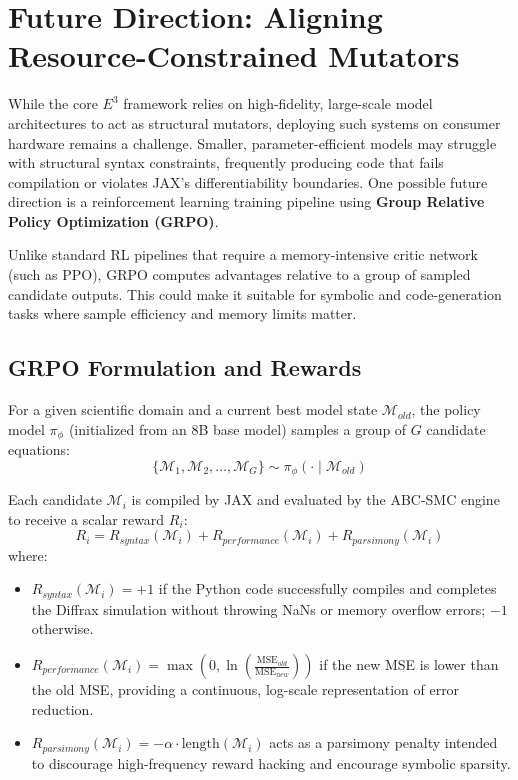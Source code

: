 \section{Future Direction: Aligning Resource-Constrained Mutators}
\label{sec:rl}

While the core $E^3$ framework relies on high-fidelity, large-scale model architectures to act as structural mutators, deploying such systems on consumer hardware remains a challenge. Smaller, parameter-efficient models may struggle with structural syntax constraints, frequently producing code that fails compilation or violates JAX's differentiability boundaries. One possible future direction is a reinforcement learning training pipeline using \textbf{Group Relative Policy Optimization (GRPO)}.

Unlike standard RL pipelines that require a memory-intensive critic network (such as PPO), GRPO computes advantages relative to a group of sampled candidate outputs. This could make it suitable for symbolic and code-generation tasks where sample efficiency and memory limits matter.

\subsection{GRPO Formulation and Rewards}
For a given scientific domain and a current best model state $\mathcal{M}_{old}$, the policy model $\pi_\phi$ (initialized from an 8B base model) samples a group of $G$ candidate equations:
\begin{equation}
    \{\mathcal{M}_1, \mathcal{M}_2, \dots, \mathcal{M}_G\} \sim \pi_\phi(\cdot \mid \mathcal{M}_{old})
\end{equation}

Each candidate $\mathcal{M}_i$ is compiled by JAX and evaluated by the ABC-SMC engine to receive a scalar reward $R_i$:
\begin{equation}
    R_i = R_{syntax}(\mathcal{M}_i) + R_{performance}(\mathcal{M}_i) + R_{parsimony}(\mathcal{M}_i)
\end{equation}
where:
\begin{itemize}
    \item $R_{syntax}(\mathcal{M}_i) = +1$ if the Python code successfully compiles and completes the Diffrax simulation without throwing NaNs or memory overflow errors; $-1$ otherwise.
    \item $R_{performance}(\mathcal{M}_i) = \max\left(0, \ln\left(\frac{\text{MSE}_{old}}{\text{MSE}_{new}}\right)\right)$ if the new MSE is lower than the old MSE, providing a continuous, log-scale representation of error reduction.
    \item $R_{parsimony}(\mathcal{M}_i) = -\alpha \cdot \text{length}(\mathcal{M}_i)$ acts as a parsimony penalty intended to discourage high-frequency reward hacking and encourage symbolic sparsity.
\end{itemize}

